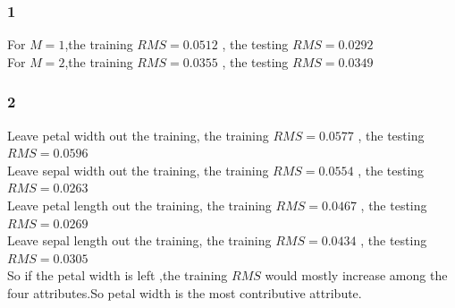 \documentclass{article}
\begin{document}
\subsubsection*{1}
For $M = 1$,the training  $ RMS = 0.0512$ , the testing $RMS =0.0292$\\
For $M = 2$,the training  $ RMS = 0.0355$ , the testing $RMS =0.0349$\\
\subsubsection*{2}
Leave petal width out the training, the training  $ RMS = 0.0577$ , the testing $RMS = 0.0596$\\
Leave sepal width out the training, the training  $ RMS = 0.0554$ , the testing $RMS = 0.0263$\\
Leave petal length out the training, the training  $ RMS =0.0467 $ , the testing $RMS =0.0269$\\
Leave sepal length out the training, the training  $ RMS =0.0434 $ , the testing $RMS =0.0305$\\
So if the petal width is left ,the training $RMS$ would mostly increase  among the four attributes.So petal width is the most contributive attribute.
\end{document}
